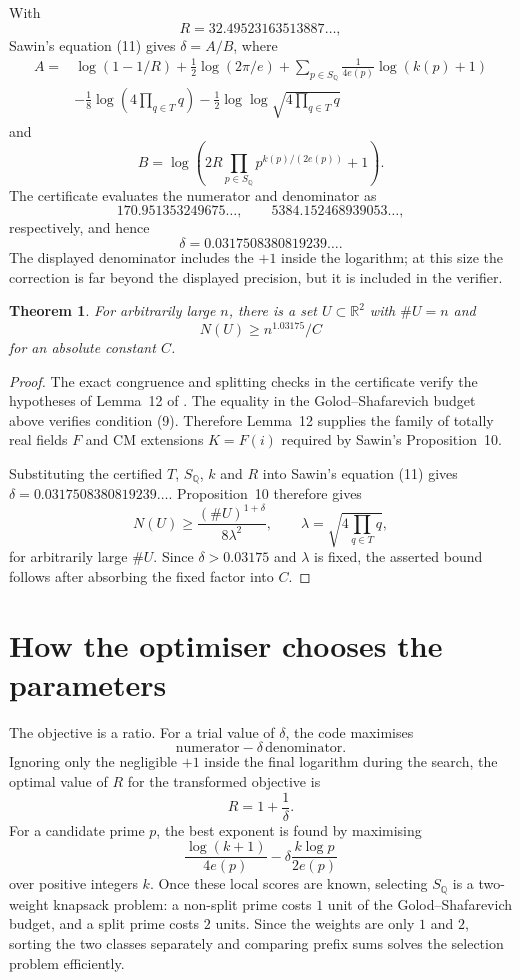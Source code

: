\documentclass[11pt]{amsart}
\newcommand{\RR}{\mathbb{R}}
\newcommand{\QQ}{\mathbb{Q}}
\newcommand{\SQ}{S_{\QQ}}
\newtheorem{theorem}{Theorem}
\begin{document}
With
\[
  R=32.49523163513887\ldots,
\]
Sawin's equation (11) gives $\delta=A/B$, where
\[
\begin{aligned}
A={}&\log(1-1/R)+\frac12\log(2\pi/e)
+\sum_{p\in\SQ}\frac{1}{4e(p)}\log(k(p)+1)\\
&-\frac18\log\!\left(4\prod_{q\in T}q\right)
-\frac12\log\log\sqrt{4\prod_{q\in T}q}
\end{aligned}
\]
and
\[
B=\log\!\left(2R\prod_{p\in\SQ}p^{k(p)/(2e(p))}+1\right).
\]
The certificate evaluates the numerator and denominator as
\[
  170.951353249675\ldots,
  \qquad
  5384.152468939053\ldots,
\]
respectively, and hence
\[
  \delta=0.0317508380819239\ldots .
\]
The displayed denominator includes the $+1$ inside the logarithm; at this size the correction is far beyond the displayed precision, but it is included in the verifier.

\begin{theorem}
  For arbitrarily large $n$, there is a set $U\subset \RR^2$ with $\#U=n$ and
  \[
    N(U) \geqslant n^{1.03175}/C
  \]
  for an absolute constant $C$.
\end{theorem}

\begin{proof}
  The exact congruence and splitting checks in the certificate verify the hypotheses of Lemma~12 of \cite{SawinExplicitLowerBound}.  The equality in the Golod--Shafarevich budget above verifies condition (9).  Therefore Lemma~12 supplies the family of totally real fields $F$ and CM extensions $K=F(i)$ required by Sawin's Proposition~10.

  Substituting the certified $T$, $\SQ$, $k$ and $R$ into Sawin's equation (11) gives $\delta=0.0317508380819239\ldots$.  Proposition~10 therefore gives
  \[
    N(U) \geqslant \frac{(\#U)^{1+\delta}}{8\lambda^2},
    \qquad
    \lambda=\sqrt{4\prod_{q\in T}q},
  \]
  for arbitrarily large $\#U$.  Since $\delta>0.03175$ and $\lambda$ is fixed, the asserted bound follows after absorbing the fixed factor into $C$.
\end{proof}

\section{How the optimiser chooses the parameters}

The objective is a ratio.  For a trial value of $\delta$, the code maximises
\[
  \text{numerator}-\delta\,\text{denominator}.
\]
Ignoring only the negligible $+1$ inside the final logarithm during the search, the optimal value of $R$ for the transformed objective is
\[
  R=1+\frac1\delta.
\]
For a candidate prime $p$, the best exponent is found by maximising
\[
  \frac{\log(k+1)}{4e(p)}-\delta\frac{k\log p}{2e(p)}
\]
over positive integers $k$.  Once these local scores are known, selecting $\SQ$ is a two-weight knapsack problem: a non-split prime costs $1$ unit of the Golod--Shafarevich budget, and a split prime costs $2$ units.  Since the weights are only $1$ and $2$, sorting the two classes separately and comparing prefix sums solves the selection problem efficiently.
\end{document}
